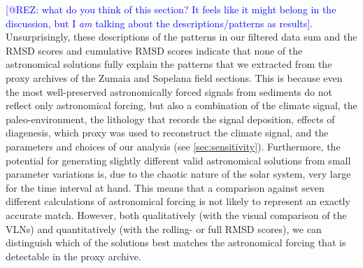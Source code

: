 \documentclass[draft]{agujournal2019}
\newcommand{\ijk}{\textcolor{blue}}
\begin{document}

\ijk{[@REZ: what do you think of this section? It feels like it might belong in the discussion, but I \emph{am} talking about the descriptions/patterns as results].}
Unsurprisingly, these descriptions of the patterns in our filtered data sum and the \gls{RMSD} scores and cumulative \gls{RMSD} scores indicate that none of the astronomical solutions fully explain the patterns that we extracted from the proxy archives of the Zumaia and Sopelana field sections.
This is because even the most well-preserved astronomically forced signals from sediments do not reflect only astronomical forcing, but also a combination of the climate signal, the paleo-environment, the lithology that records the signal deposition, effects of diagenesis, which proxy was used to reconstruct the climate signal, and the parameters and choices of our analysis (see \ref{sec:sensitivity}).
Furthermore, the potential for generating slightly different valid astronomical solutions from small parameter variations is, due to the chaotic nature of the solar system, very large for the time interval at hand.
This means that a comparison against seven different calculations of astronomical forcing is not likely to represent an exactly accurate match.
However, both qualitatively (with the visual comparison of the \glspl{VLN}) and quantitatively (with the rolling- or full \gls{RMSD} scores), we can distinguish which of the solutions best matches the astronomical forcing that is detectable in the proxy archive.
\end{document}
